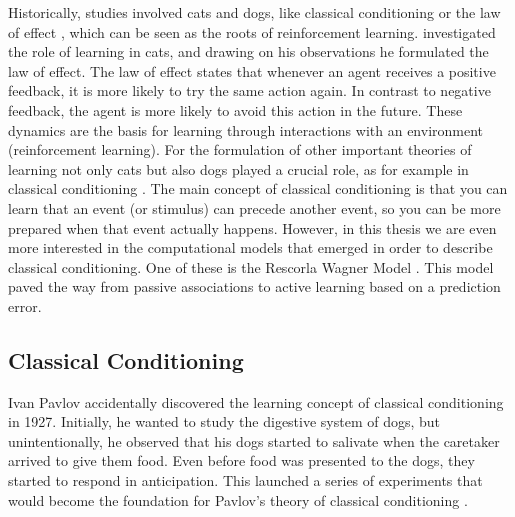 Historically, studies involved cats and dogs, like classical conditioning \citep{pavlov1927conditional} or the law of effect \citep{thorndike1927law}, which can be seen as the roots of reinforcement learning. 
\citet{thorndike1927law} investigated the role of learning in cats, and drawing on his observations he formulated the law of effect.
The law of effect states that whenever an agent receives a positive feedback, it is more likely to try the same action again. In contrast to negative feedback, the agent is more likely to avoid this action in the future.
These dynamics are the basis for learning through interactions with an environment (reinforcement learning).%
For the formulation of other important theories of learning not only cats but also dogs played a crucial role, as for example in classical conditioning \citep{pavlov1927conditional}. 
The main concept of classical conditioning is that you can learn that an event (or stimulus) can precede another event, so you can be more prepared when that event actually happens. However, in this thesis we are even more interested in the computational models that emerged in order to describe classical conditioning. One of these is the Rescorla Wagner Model \citep{rescorla1972theory}. This model paved the way from passive associations to active learning based on a prediction error.

\subsection{Classical Conditioning}
Ivan Pavlov accidentally discovered the learning concept of classical conditioning in 1927. Initially, he wanted to study the digestive system of dogs, but unintentionally, he observed that his dogs started to salivate when the caretaker arrived to give them food. Even before food was presented to the dogs, they started to respond in anticipation. This launched a series of experiments that would become the foundation for Pavlov's theory of classical conditioning \citep{pavlov1927conditional}.  

